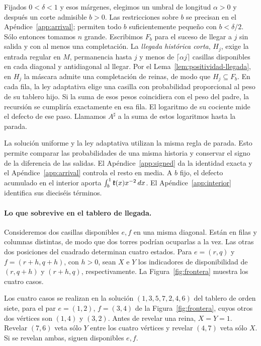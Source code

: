 Fijados \(0<\delta<1\) y esos márgenes, elegimos un umbral de longitud \(\alpha>0\) y después un
corte admisible \(b>0\). Las restricciones sobre \(b\) se precisan en el
Apéndice~\ref{app:arrival}; permiten todo \(b\) suficientemente pequeño con \(b<\delta/2\).
Sólo entonces tomamos \(n\) grande. Escribimos \(F_b\) para el suceso de llegar a \(j\) sin
salida y con al menos una completación. La \emph{llegada histórica corta}, \(H_j\), exige la
entrada regular en \(M\), permanencia hasta \(j\) y menos de \(\lceil\alpha j\rceil\) casillas
disponibles en cada diagonal y antidiagonal al llegar. Por el Lema~\ref{lem:positividad-llegada}, en
 \(H_j\) la máscara admite una
completación de reinas, de modo que \(H_j\subseteq F_b\).
En cada fila, la ley adaptativa elige una casilla con probabilidad proporcional al peso de su
tablero hijo. Si la suma de esos pesos coincidiera con el peso del padre, la recursión se
cumpliría exactamente en esa fila. El logaritmo de su cociente mide el defecto de ese paso.
Llamamos \(A^\sharp\) a la suma de estos logaritmos hasta la parada.

La solución uniforme y la ley adaptativa utilizan la misma regla de parada. Esto permite comparar
las probabilidades de una misma historia y conservar el signo de la diferencia de las salidas.
El Apéndice~\ref{app:signed} da la identidad exacta y el Apéndice~\ref{app:arrival} controla
el resto en media. A \(b\) fijo, el defecto acumulado en el interior aporta
\(\int_b^1 \mathfrak{k}(x)x^{-2}\,dx\). El Apéndice~\ref{app:interior} identifica sus dieciséis términos.

\paragraph{Lo que sobrevive en el tablero de llegada.}
Consideremos dos casillas disponibles \(e,f\) en una misma diagonal. Están en filas y columnas
distintas, de modo que dos torres podrían ocuparlas a la vez. Las otras dos posiciones del
cuadrado determinan cuatro estados. Para \(e=(r,q)\) y \(f=(r+h,q+h)\), con \(h>0\),
sean \(X\) e \(Y\) los indicadores de disponibilidad de \((r,q+h)\) y \((r+h,q)\),
respectivamente. La Figura~\ref{fig:frontera} muestra los cuatro casos.


Los cuatro casos se realizan en la solución \((1,3,5,7,2,4,6)\) del tablero de orden siete, para el
par \(e=(1,2)\), \(f=(3,4)\) de la Figura~\ref{fig:frontera}, cuyos otros dos vértices son \((1,4)\) y
\((3,2)\).
Antes de revelar una reina, \(X=Y=1\). Revelar \((7,6)\) veta sólo \(Y\) entre los cuatro
vértices y revelar \((4,7)\) veta sólo \(X\). Si se revelan ambas, siguen disponibles \(e,f\).

